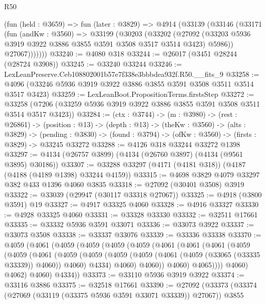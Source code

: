 \begin{lexlean}{R50}
\begin{coremodule}
      (fun (held : @3659) =>
      fun (later : @3829) =>
      @4914
        (@33139
          (@33146
            (@33171
              (fun (andKw : @3560) =>
              @33199
                (@30203
                  (@33202
                    (@27092
                      (@33203 @5936 @3919 @3922 @3886 @3855 @3591 @3508 @3517 @3514 @3423)
                      @5986))
                  @27067)))))))
@33240 := @4080 @318
@33244 := @26017 (@3451 @28244 (@28724 @3908))
@33245 := @33240 @33244
@33246 := LexLeanPreserve.Ceb108802001b57e7f338e3bbbdea932f.R50.__fits_9
@33258 := @4096 (@33246 @5936 @3919 @3922 @3886 @3855 @3591 @3508 @3511 @3514 @3517 @3423)
@33259 := LexLeanBoot.PropositionTerms.firstsStep
@33272 := @33258 (@7206 (@33259 @5936 @3919 @3922 @3886 @3855 @3591 @3508 @3511 @3514 @3517 @3423))
@33284 := (ctx : @3744) ->
  (m : @3980) ->
  (rest : @26861) ->
  (position : @13) ->
  (depth : @13) ->
  (theKw : @3560) ->
  (alts : @3829) ->
  (pending : @3830) -> (found : @3794) -> (ofKw : @3560) -> (firsts : @3829) -> @33245 @33272
@33288 := @4126 @318 @33244 @33272 @1398
@33297 := @4134 (@26757 @3899) (@4134 (@26760 @3897) (@4134 (@9561 @3895) @30186))
@33307 := @33288 @33297 (@4171 (@4181 @318)) (@4187 (@4188 (@4189 @1398) @33244 @4159))
@33315 := @4698 @3829 @4079 @33297 @382 @433 @1396 @4060 @3835
@33318 := @27092 (@30401 @3508) @3919
@33322 := @33039 (@29947 (@30117 @33318 @27067))
@33325 := @4918 (@3800 @3591) @19
@33327 := @4917 @33325 @4060
@33328 := @4916 @33327
@33330 := @4928 @33325 @4060
@33331 := @33328 @33330
@33332 := @32511 @17661
@33335 := @33332 @5936 @3591 @33071
@33336 := @33073 @3922
@33337 := @33073 @3508
@33338 := @33337 @33076
@33339 := @33336 @33338
@33370 := @4059
    (@4061
      (@4059
        (@4059
          (@4059
            (@4059
              (@4061
                (@4061
                  (@4061
                    (@4059
                      (@4059
                        (@4061
                          (@4059
                            (@4059
                              (@4059
                                (@4059 (@4061 (@4059 (@33065 (@33335 @33339)) @4060)) @4060)
                                @4334)
                              @4060)
                            @4060))
                        @4060)
                      @4065))))
              @4060)
            @4062)
          @4060)
        @4334))
@33373 := @33110 @5936 @3919 @3922
@33374 := @33116 @3886
@33375 := @32518 @17661
@33390 := @27092
    (@33373
      (@33374 (@27069 (@33119 (@33375 @5936 @3591 @33071 @33339)) @27067))
      @3855

\end{coremodule}
\end{lexlean}
